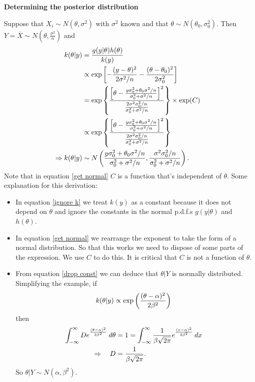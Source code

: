 \documentclass[10pt, two column]{article}
\begin{document}
{\bf Determining the posterior distribution}

Suppose that $X_{i} \sim N(\theta, \sigma^{2})$ with $\sigma^{2}$ known and that $\theta \sim N(\theta_{0}, \sigma_{0}^{2})$. Then $Y = \overline{X} \sim N(\theta, \frac{\sigma^{2}}{n})$ and \vspace{-10pt}  
\begin{align} 
k(\theta \vert y) &= \frac{g(y \vert \theta) h(\theta)}{k(y)} \notag \\
&\propto \exp \left[ -\frac{(y - \theta)^{2}}{2\sigma^{2}/n} - \frac{(\theta - \theta_{0})^{2}}{2\sigma_{0}^{2}} \right] \label{ignore k}\\ 
&= \exp \left\{ \frac{\left[ \theta - \frac{y\sigma_{0}^{2} + \theta_{0}\sigma^{2}/n}{\sigma_{0}^{2} + \sigma^{2}/n} \right]^{2}}{ \frac{2\sigma^{2}\sigma_{0}^{2}/n}{\sigma_{0}^{2} + \sigma^{2}/n} } \right\} \times \exp(C) \label{get normal}\\ 
&\propto \exp \left\{ \frac{\left[ \theta - \frac{y\sigma_{0}^{2} + \theta_{0}\sigma^{2}/n}{\sigma_{0}^{2} + \sigma^{2}/n} \right]^{2}}{ \frac{2\sigma^{2}\sigma_{0}^{2}/n}{\sigma_{0}^{2} + \sigma^{2}/n} } \right\} \label{drop const}\\
\Rightarrow k(\theta \vert y) &\sim N \left( \frac{y\sigma_{0}^{2} + \theta_{0}\sigma^{2}/n}{\sigma_{0}^{2} + \sigma^{2}/n}, \frac{\sigma^{2}\sigma_{0}^{2}/n}{\sigma_{0}^{2} + \sigma^{2}/n}  \right). \notag \vspace{-10pt}    
\end{align}
Note that in equation \eqref{get normal} $C$ is a function that's independent of $\theta$. Some explanation for this derivation:
\begin{itemize}
\item In equation \eqref{ignore k} we treat $k(y)$ as a constant because it does not depend on $\theta$ and ignore the constants in the normal p.d.f.s $g(y \vert \theta)$ and $h(\theta)$. 
\item In equation \eqref{get normal} we rearrange the exponent to take the form of a normal distribution. So that this works we need to dispose of some parts of the expression. We use $C$ to do this. It is critical that $C$ is not a function of $\theta$. 
\item From equation \eqref{drop const} we can deduce that $\theta \vert Y$ is normally distributed. Simplifying the example, if \vspace{-10pt}
\[
k(\theta \vert y) \propto \exp \left( \frac{(\theta - \alpha)^{2}}{2\beta^{2}} \right)  \vspace{-10pt}
\]
then \vspace{-5pt}
\begin{align*}
\int_{-\infty}^{\infty} D e^{\frac{(\theta - \alpha)^{2}}{2\beta^{2}} } \: d\theta &= 1 = \int_{-\infty}^{\infty} \frac{1}{\beta\sqrt{2\pi}} e^{\frac{(x - \alpha)^{2}}{2\beta^{2}} } \: dx \\
\Rightarrow \quad D &= \frac{1}{\beta\sqrt{2\pi}}. \vspace{-10pt}
\end{align*} 
So $\theta \vert Y \sim N(\alpha, \beta^{2})$. \vspace{-5pt}
\end{itemize}
\end{document}
